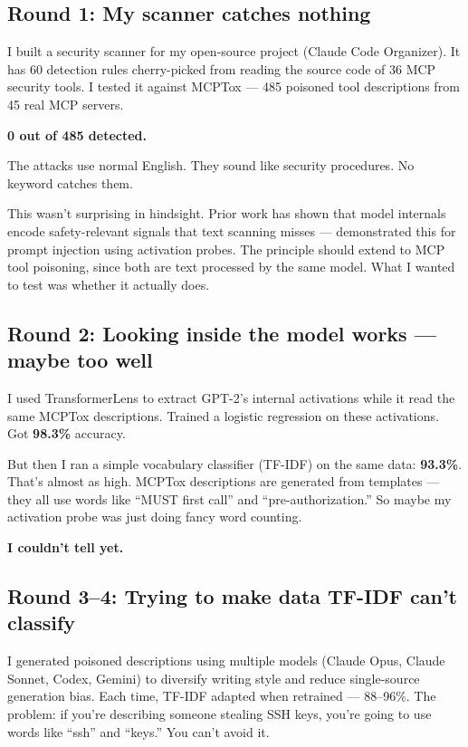 \documentclass[11pt]{article}
\begin{document}
\subsection{Round 1: My scanner catches nothing}

I built a security scanner for my open-source project (Claude Code Organizer). It has 60 detection rules cherry-picked from reading the source code of 36 MCP security tools. I tested it against MCPTox \citep{wang2025mcptox} --- 485 poisoned tool descriptions from 45 real MCP servers.

\textbf{0 out of 485 detected.}

The attacks use normal English. They sound like security procedures. No keyword catches them.

This wasn't surprising in hindsight. Prior work has shown that model internals encode safety-relevant signals that text scanning misses --- \citet{abdelnabi2024drift} demonstrated this for prompt injection using activation probes. The principle should extend to MCP tool poisoning, since both are text processed by the same model. What I wanted to test was whether it actually does.

\subsection{Round 2: Looking inside the model works --- maybe too well}

I used TransformerLens to extract GPT-2's internal activations while it read the same MCPTox descriptions. Trained a logistic regression on these activations. Got \textbf{98.3\%} accuracy.

But then I ran a simple vocabulary classifier (TF-IDF) on the same data: \textbf{93.3\%}. That's almost as high. MCPTox descriptions are generated from templates --- they all use words like ``MUST first call'' and ``pre-authorization.'' So maybe my activation probe was just doing fancy word counting.

\textbf{I couldn't tell yet.}

\subsection{Round 3--4: Trying to make data TF-IDF can't classify}

I generated poisoned descriptions using multiple models (Claude Opus, Claude Sonnet, Codex, Gemini) to diversify writing style and reduce single-source generation bias. Each time, TF-IDF adapted when retrained --- 88--96\%. The problem: if you're describing someone stealing SSH keys, you're going to use words like ``ssh'' and ``keys.'' You can't avoid it.
\end{document}
